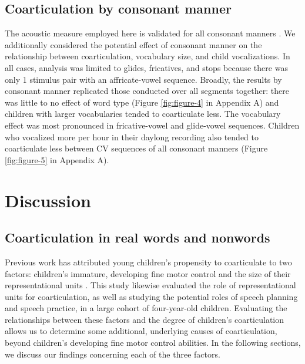 \documentclass[a4paper,man,natbib,donotrepeattitle, apacite]{apa6}
\begin{document}
\subsection{Coarticulation by consonant manner}

The acoustic measure employed here is validated for all consonant manners \cite{cychoszSpectralTemporalMeasures2019,gerosaAnalyzingChildrenSpeech2006}. We additionally considered the potential effect of consonant manner on the relationship between coarticulation, vocabulary size, and child vocalizations. In all cases, analysis was limited to glides, fricatives, and stops because there was only 1 stimulus pair with an affricate-vowel sequence. Broadly, the results by consonant manner replicated those conducted over all segments together: there was little to no effect of word type (Figure \ref{fig:figure-4} in Appendix A) and children with larger vocabularies tended to coarticulate less. The vocabulary effect was most pronounced in fricative-vowel and glide-vowel sequences. Children who vocalized more per hour in their daylong recording also tended to coarticulate less between CV sequences of all consonant manners (Figure \ref{fig:figure-5} in Appendix A). 

\section{Discussion}

\subsection{Coarticulation in real words and nonwords}

Previous work has attributed young children’s propensity to coarticulate to two factors: children’s immature, developing fine motor control \cite{barbierWhatAnticipatoryCoarticulation2020,rubertusDevelopmentGesturalOrganization2018,zharkovaUltrasoundStudyDevelopment2018} and the size of their representational units \cite{nittrouerEmergencePhoneticSegments1989,nittrouerHowChildrenLearn1996,noiraySpokenLanguageDevelopment2019,zharkovaCoarticulationIndicatorSpeech2011}. This study likewise evaluated the role of representational units for coarticulation, as well as studying the potential roles of speech planning and speech practice, in a large cohort of four-year-old children. Evaluating the relationships between these factors and the degree of children’s coarticulation allows us to determine some additional, underlying causes of coarticulation, beyond children’s developing fine motor control abilities. In the following sections, we discuss our findings concerning each of the three factors.
\end{document}
